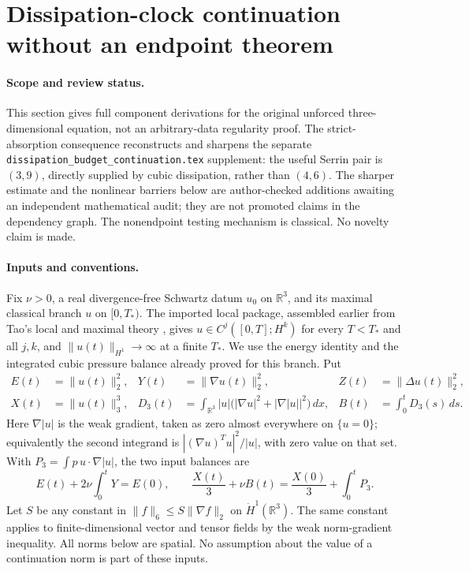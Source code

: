 \section{Dissipation-clock continuation without an endpoint theorem}
\label{dc:section}

\paragraph{Scope and review status.}
This section gives full component derivations for the original unforced
three-dimensional equation, not an arbitrary-data regularity proof.  The
strict-absorption consequence reconstructs and sharpens the separate
\texttt{dissipation\_budget\_continuation.tex} supplement: the useful Serrin
pair is $(3,9)$, directly supplied by cubic dissipation, rather than $(4,6)$.
The sharper estimate and the nonlinear barriers below are author-checked
additions awaiting an independent mathematical audit; they are not promoted
claims in the dependency graph.  The nonendpoint testing mechanism is
classical.  No novelty claim is made.

\paragraph{Inputs and conventions.}
Fix $\nu>0$, a real divergence-free Schwartz datum $u_0$ on $\mathbb R^3$,
and its maximal classical branch $u$ on $[0,T_*)$.  The imported local
package, assembled earlier from Tao's local and maximal theory
\cite{Tao2013}, gives $u\in C^j([0,T];H^k)$ for every $T<T_*$ and all
$j,k$, and $\|u(t)\|_{H^1}\to\infty$ at a finite $T_*$.  We use the energy
identity and the integrated cubic pressure balance already proved for this
branch.  Put
\begin{align*}
 E(t)&=\|u(t)\|_2^2,&Y(t)&=\|\nabla u(t)\|_2^2,&Z(t)&=\|\Delta u(t)\|_2^2,\\
 X(t)&=\|u(t)\|_3^3,&
 D_3(t)&=\int_{\mathbb R^3}|u|
          \bigl(|\nabla u|^2+|\nabla |u||^2\bigr)\,dx,&
 B(t)&=\int_0^tD_3(s)\,ds.
\end{align*}
Here $\nabla|u|$ is the weak gradient, taken as zero almost everywhere on
$\{u=0\}$; equivalently the second integrand is
$|(\nabla u)^Tu|^2/|u|$, with zero value on that set.  With
$P_3=\int p\,u\cdot\nabla|u|$, the two input balances are
\begin{equation}\label{dc:balances}
 E(t)+2\nu\int_0^tY=E(0),\qquad
 \frac{X(t)}3+\nu B(t)=\frac{X(0)}3+\int_0^tP_3.
\end{equation}
Let $S$ be any constant in $\|f\|_6\le S\|\nabla f\|_2$ on
$\dot H^1(\mathbb R^3)$.  The same constant applies to finite-dimensional
vector and tensor fields by the weak norm-gradient inequality.  All norms
below are spatial.  No assumption about the value of a continuation norm is
part of these inputs.

